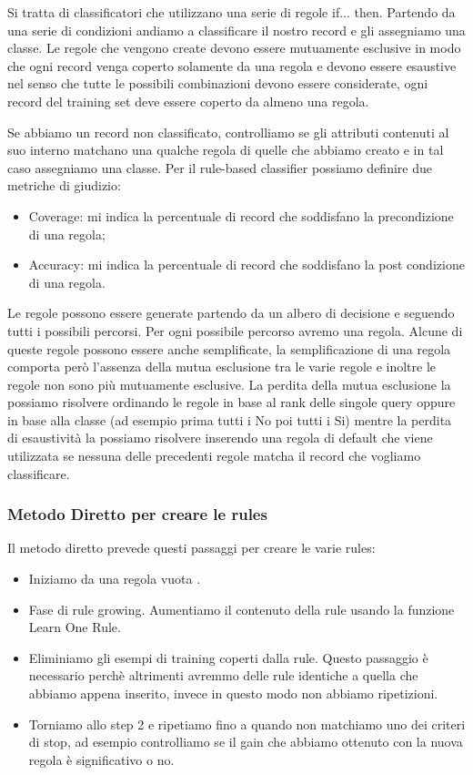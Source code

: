 \documentclass[14pt]{extreport}
\begin{document}
Si tratta di classificatori che utilizzano una serie di regole if... then.
Partendo da una serie di condizioni andiamo a classificare il nostro record e gli assegniamo una classe.
Le regole che vengono create devono essere mutuamente esclusive in modo che ogni record venga coperto solamente da una regola e devono essere esaustive nel senso che tutte le possibili combinazioni devono essere considerate, ogni record del training set deve essere coperto da almeno una regola.

Se abbiamo un record non classificato, controlliamo se gli attributi contenuti al suo interno matchano una qualche regola di quelle che abbiamo creato e in tal caso assegniamo una classe.
Per il rule-based classifier possiamo definire due metriche di giudizio:
\begin{itemize}
    \item Coverage: mi indica la percentuale di record che soddisfano la precondizione di una regola;
    \item Accuracy: mi indica la percentuale di record che soddisfano la post condizione di una regola.
\end{itemize}

Le regole possono essere generate partendo da un albero di decisione e seguendo tutti i possibili percorsi. Per ogni possibile percorso avremo una regola. Alcune di queste regole possono essere anche semplificate, la semplificazione di una regola comporta però l'assenza della mutua esclusione tra le varie regole e inoltre le regole non sono più mutuamente esclusive. La perdita della mutua esclusione la possiamo risolvere ordinando le regole in base al rank delle singole query oppure in base alla classe (ad esempio prima tutti i No poi tutti i Si) mentre la perdita di esaustività la possiamo risolvere inserendo una regola di default che viene utilizzata se nessuna delle precedenti regole matcha il record che vogliamo classificare.

\subsubsection{Metodo Diretto per creare le rules}

Il metodo diretto prevede questi passaggi per creare le varie rules:
\begin{itemize}
    \item Iniziamo da una regola vuota ${}$.
    \item Fase di rule growing. Aumentiamo il contenuto della rule usando la funzione Learn One Rule.
    \item Eliminiamo gli esempi di training coperti dalla rule. Questo passaggio è necessario perchè altrimenti avremmo delle rule identiche a quella che abbiamo appena inserito, invece in questo modo non abbiamo ripetizioni.
    \item Torniamo allo step 2 e ripetiamo fino a quando non matchiamo uno dei criteri di stop, ad esempio controlliamo se il gain che abbiamo ottenuto con la nuova regola è significativo o no.
\end{itemize}
\end{document}
